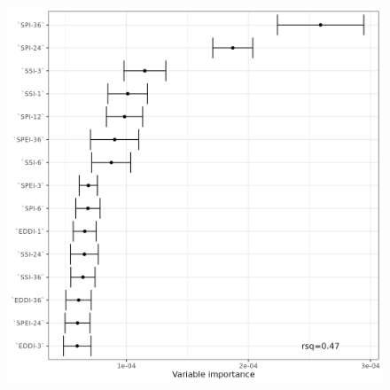 \documentclass[
  authoryear,
  preprint,
  3p,
  onecolumn]{elsarticle}
\begin{document}
\begin{figure}
\begin{minipage}[t]{0.33\linewidth}
{{\includegraphics{../output/figs/fig_errorbar_resample_random_forest_trends_Shrubland.png}

}

}

\end{minipage}%
%
\begin{minipage}[t]{0.33\linewidth}

{\centering 

}
\end{minipage}
\end{figure}
\end{document}
